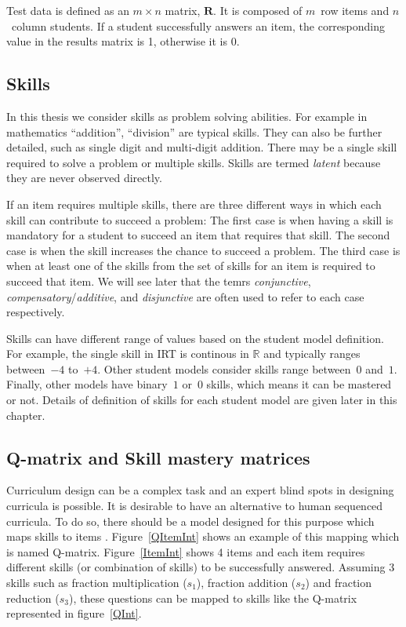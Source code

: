 Test data is defined as an $m \times n$ matrix, $\mathbf{R}$. It is composed of $m$~row items and $n$~column students. If a student successfully answers an item, the corresponding value in the results matrix is 1, otherwise it is 0.

\subsection{Skills}

In this thesis we consider skills as problem solving abilities. For example in mathematics ``addition'', ``division'' are typical skills.  They can also be further detailed, such as single digit and multi-digit addition. There may be a single skill required to solve a problem or multiple skills. Skills are termed \textit{latent}  because they are never observed directly.

If an item requires multiple skills, there are three different ways in which each skill can contribute to succeed a problem: The first case is when having a skill is mandatory for a student to succeed an item that requires that skill. The second case is when the skill increases the chance to succeed a problem. The third case is when at least one of the skills from the set of skills for an item is required to succeed that item.  We will see later that the temrs \textit{conjunctive}, \textit{compensatory}/\textit{additive}, and \textit{disjunctive} are often used to refer to each case respectively.

Skills can have different range of values based on the student model definition. For example, the single skill in IRT is continous in $\mathbb{R}$ and typically ranges between~$-4$ to~$+4$. Other student models consider skills range between~$0$ and~$1$. Finally, other models have binary~$1$ or~$0$ skills, which means it can be mastered or not. Details of definition of skills for each student model are given later in this chapter.

\subsection{Q-matrix and Skill mastery matrices}


Curriculum design can be a complex task and an expert blind spots in designing curricula is possible. It is desirable to have an alternative to human sequenced curricula. To do so, there should be a model designed for this purpose which maps skills to items \citep{Tatsuoka1983,Tatsuoka2009}. Figure~\ref{QItemInt} shows an example of this mapping which is named  Q-matrix.  Figure~\ref{ItemInt} shows 4 items and each item requires different skills (or combination of skills) to be successfully answered. Assuming 3 skills such as fraction multiplication ($s_{1}$), fraction addition ($s_{2}$) and fraction reduction ($s_{3}$), these questions can be mapped to skills like the Q-matrix represented in figure~\protect\ref{QInt}. 

